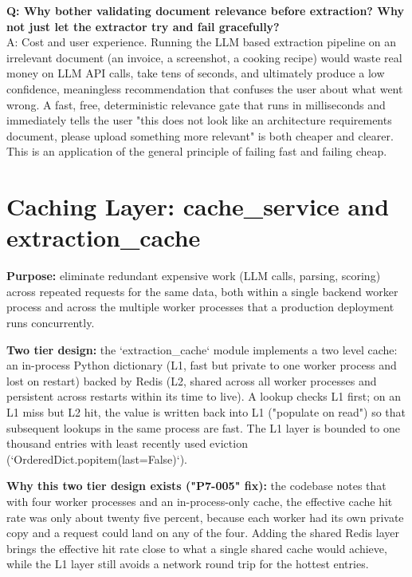\documentclass[11pt,a4paper]{report}
\begin{document}
\begin{qabox}
\textbf{Q: Why bother validating document relevance before extraction? Why not just let the extractor try and fail gracefully?} \\
A: Cost and user experience. Running the LLM based extraction pipeline on an irrelevant document (an invoice, a screenshot, a cooking recipe) would waste real money on LLM API calls, take tens of seconds, and ultimately produce a low confidence, meaningless recommendation that confuses the user about what went wrong. A fast, free, deterministic relevance gate that runs in milliseconds and immediately tells the user "this does not look like an architecture requirements document, please upload something more relevant" is both cheaper and clearer. This is an application of the general principle of failing fast and failing cheap.
\end{qabox}

\section{Caching Layer: cache\_service and extraction\_cache}

\textbf{Purpose:} eliminate redundant expensive work (LLM calls, parsing, scoring) across repeated requests for the same data, both within a single backend worker process and across the multiple worker processes that a production deployment runs concurrently.

\textbf{Two tier design:} the `extraction_cache` module implements a two level cache: an in-process Python dictionary (L1, fast but private to one worker process and lost on restart) backed by Redis (L2, shared across all worker processes and persistent across restarts within its time to live). A lookup checks L1 first; on an L1 miss but L2 hit, the value is written back into L1 ("populate on read") so that subsequent lookups in the same process are fast. The L1 layer is bounded to one thousand entries with least recently used eviction (`OrderedDict.popitem(last=False)`).

\textbf{Why this two tier design exists ("P7-005" fix):} the codebase notes that with four worker processes and an in-process-only cache, the effective cache hit rate was only about twenty five percent, because each worker had its own private copy and a request could land on any of the four. Adding the shared Redis layer brings the effective hit rate close to what a single shared cache would achieve, while the L1 layer still avoids a network round trip for the hottest entries.
\end{document}
